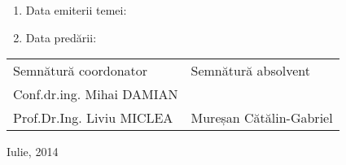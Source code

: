 \documentclass[12pt,a4paper,twoside]{report}
\begin{document}
\begin{titlepage}
\begin{flushleft}
\begin{enumerate}
 \item Data emiterii temei: \dotfill

 \item Data predării: \dotfill
\end{enumerate}

\end{flushleft}

\vspace{0.5cm}

\begin{center}

%
\begin{tabularx}{\textwidth}{lR}
Semnătură coordonator & Semnătură absolvent \\
Conf.dr.ing. Mihai DAMIAN\\Prof.Dr.Ing. Liviu MICLEA & Mureșan Cătălin-Gabriel \\
\end{tabularx}

Iulie, 2014\\

\end{center}

\end{titlepage}


\begin{titlepage}
\phantom{1}
\end{titlepage}
\end{document}
